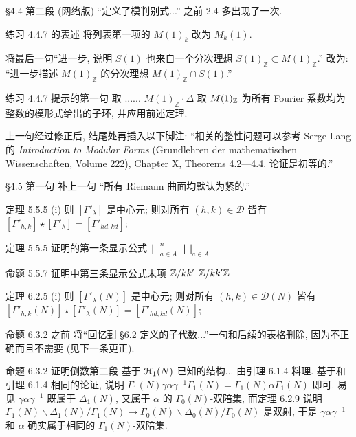 \documentclass{AJerrata}
\begin{document}
\begin{Errata}
		\item[\S 4.4 第二段 (网络版)]
		``定义了模判别式...'' 之前 2.4 多出现了一次.
		
		\item[练习 4.4.7 的表述]
		将列表第一项的 $M(1)_k$ 改为 $M_k(1)$.
		
		将最后一句``进一步, 说明 $S(1)$ 也来自一个分次理想 $S(1)_{\mathbb{Z}} \subset M(1)_{\mathbb{Z}}$.'' 改为: ``进一步描述 $M(1)_{\mathbb{Z}}$ 的分次理想 $M(1)_{\mathbb{Z}} \cap S(1)$.''
		
		\item[练习 4.4.7 提示的第一句]
		\Orig 取 ...... $M(1)_{\mathbb{Z}} \cdot \Delta$
		\Corr 取 $M(1)_{\mathbb{Z}}$ 为所有 Fourier 系数均为整数的模形式给出的子环, 并应用前述定理.
		
		上一句经过修正后, 结尾处再插入以下脚注: ``相关的整性问题可以参考 Serge Lang 的 \textit{Introduction to Modular Forms} (Grundlehren der mathematischen Wissenschaften, Volume 222), Chapter X, Theorems 4.2---4.4. 论证是初等的.''
		
		\item[\S 4.5 第一句]
		补上一句 ``所有 Riemann 曲面均默认为紧的.''
		
		\item[定理 5.5.5 (i)]
		\Orig 则 $[\Gamma'_\lambda]$ 是中心元;
		\Corr 则对所有 $(h, k) \in \mathcal{D}$ 皆有 $[\Gamma'_{h,k}] \star [\Gamma'_\lambda] = [\Gamma'_{hd, kd}]$;
		
		\item[定理 5.5.5 证明的第一条显示公式]
		\Orig $\displaystyle\bigsqcup_{a \in A}^n$
		\Corr $\displaystyle\bigsqcup_{a \in A}$
		
		\item[命题 5.5.7 证明中第三条显示公式末项]
		\Orig $\mathbb{Z}/kk'$
		\Corr $\mathbb{Z}/kk' \mathbb{Z}$

		\item[定理 6.2.5 (i)]
		\Orig 则 $[\Gamma'_\lambda(N)]$ 是中心元;
		\Corr 则对所有 $(h, k) \in \mathcal{D}(N)$ 皆有 $[\Gamma'_{h,k}(N)] \star [\Gamma'_\lambda(N)] = [\Gamma'_{hd, kd}(N)]$;

		\item[命题 6.3.2 之前]
		将``回忆到 \S 6.2 定义的子代数...''一句和后续的表格删除, 因为不正确而且不需要 (见下一条更正).
		
		\item[命题 6.3.2 证明倒数第二段]
		\Orig 基于 $\EuScript{H}_1(N)$ 已知的结构... 由引理 6.1.4 料理.
		\Corr 基于和引理 6.1.4 相同的论证, 说明 $\Gamma_1(N) \gamma\alpha\gamma^{-1} \Gamma_1(N) = \Gamma_1(N)\alpha\Gamma_1(N)$ 即可. 易见 $\gamma\alpha\gamma^{-1}$ 既属于 $\Delta_1(N)$, 又属于 $\alpha$ 的 $\Gamma_0(N)$-双陪集, 而定理 6.2.9 说明 \linebreak $\Gamma_1(N) \backslash \Delta_1(N) / \Gamma_1(N) \to \Gamma_0(N) \backslash \Delta_0(N) / \Gamma_0(N)$ 是双射, 于是 $\gamma\alpha\gamma^{-1}$ 和 $\alpha$ 确实属于相同的 $\Gamma_1(N)$-双陪集.
		

\end{Errata}
\end{document}
